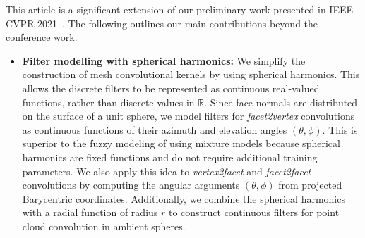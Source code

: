 This article is a significant extension of our preliminary work presented in IEEE CVPR 2021~\cite{lei2021picasso}. 
The following outlines our main contributions  beyond the conference work.
\begin{itemize}
\item {\color{black}\textbf{Filter modelling with spherical harmonics:} We simplify the construction of mesh convolutional kernels by using spherical harmonics. This allows the discrete filters to be represented as continuous real-valued functions, rather than discrete values in $\mathbb{R}$. Since face normals are distributed on the surface of a unit sphere, we model filters for \textit{facet2vertex} convolutions as continuous functions of their azimuth and elevation angles $(\theta, \phi)$. This is superior to the fuzzy modeling of using mixture models \cite{lei2021picasso} because spherical harmonics are fixed functions and do not require additional training parameters. We also apply this idea to \textit{vertex2facet} and \textit{facet2facet} convolutions by computing the angular arguments $(\theta, \phi)$ from projected Barycentric coordinates. Additionally, we combine the spherical harmonics with a radial function of radius $r$ to construct continuous filters for point cloud convolution in ambient spheres.

}
\end{itemize}
